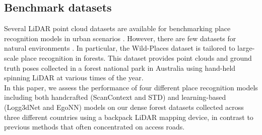 \subsection*{Benchmark datasets} 
Several LiDAR point cloud datasets are available for benchmarking place recognition models in urban scenarios \cite{maddern2017ijrr, behley2019iccv, kim2020icra}. However, there are few datasets  for natural environments \cite{triest2022icra, knights2023icra}. In particular, the Wild-Places dataset \cite{knights2023icra} is tailored to large-scale place recognition in forests. This dataset provides point clouds and ground truth poses collected in a forest national park in Australia using hand-held spinning LiDAR at various times of the year. \\

In this paper, we assess the performance of four different place recognition models including both handcrafted (ScanContext and STD) and learning-based (Logg3dNet and EgoNN) models on our dense forest datasets collected across three different countries using a backpack LiDAR mapping device, in contrast to previous methods that often concentrated on access roads. 


